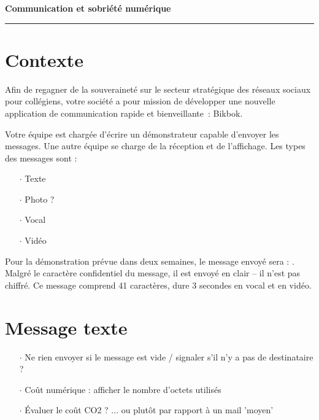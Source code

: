 \documentclass[a4paper]{article}
\begin{document}
\begin{center}
  \Large\bf Communication et sobriété numérique
\end{center}

\noindent\rule{\linewidth}{.6pt}

\section*{Contexte}

Afin de regagner de la souveraineté sur le secteur stratégique des réseaux sociaux pour collégiens, votre société a pour mission de développer une nouvelle application de communication rapide et bienveillante~: Bikbok.

Votre équipe est chargée d'écrire un démonstrateur capable d'envoyer les messages. Une autre équipe se charge de la réception et de l'affichage. Les types des messages sont :

\begin{itemize}[itemsep=0.2ex]
\item[$\cdot$] Texte
\item[$\cdot$] Photo ?
\item[$\cdot$] Vocal
\item[$\cdot$] Vidéo
\end{itemize}

Pour la démonstration prévue dans deux semaines, le message envoyé sera : . Malgré le caractère confidentiel du message, il  est envoyé en clair -- il n'est pas chiffré. Ce message comprend 41 caractères, dure 3 secondes en vocal et en vidéo.

\section{Message texte}




\begin{itemize}[itemsep=0.2ex]
\item[$\cdot$] Ne rien envoyer si le message est vide / signaler s'il n'y a pas de destinataire ?
\item[$\cdot$] Coût numérique : afficher le nombre d'octets utilisés
\item[$\cdot$] Évaluer le coût CO2 ? ... ou plutôt par rapport à un mail  'moyen'
\end{itemize}
\end{document}
